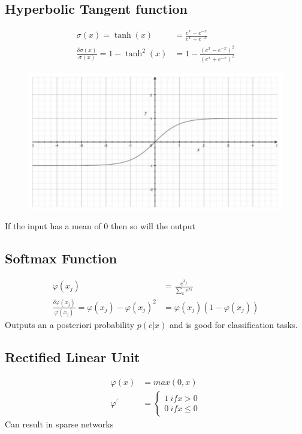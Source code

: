 \documentclass[paper=a4, fontsize=11pt]{scrartcl} %
\begin{document}
\subsection{Hyperbolic Tangent function}
\label{ssect:hyperbolic-tangent-function}
\begin{align*}
\sigma(x) = \tanh(x) &= \frac{e^x - e^{-x}}{e^x + e^{-x}} \\
\frac{\delta \sigma(x)}{\sigma(x)} = 1 - \tanh^2(x) &= 1 - \frac{(e^x - e^{-x})^2}{(e^x + e^{-x})^2}
\end{align*}
\begin{figure}[h]
\includegraphics[scale=0.6]{img/tanh}
\end{figure}
If the input has a mean of 0 then so will the output

\subsection{Softmax Function}
\label{ssect:softmax-function}
\begin{align*}
\varphi(x_j) &= \frac{e^{x_j}}{\sum_k e^{x_k}} \\
\frac{\delta \varphi(x_j)}{\varphi(x_j)} = \varphi(x_j) - \varphi(x_j)^2 &= \varphi(x_j)(1 - \varphi(x_j))
\end{align*}
Outputs an a posteriori probability $p(c | x)$ and is good for classification tasks.

\subsection{Rectified Linear Unit}
\label{ssect:softmax-function}
\begin{align*}
\varphi(x) &= max(0,x) \\
\varphi^{'} &= \begin{cases}
1 \: if x > 0\\
0 \: if x \leq 0
\end{cases}
\end{align*}
Can result in sparse networks
\end{document}
